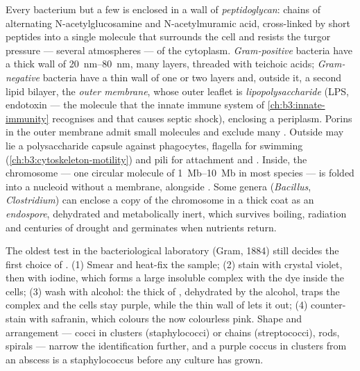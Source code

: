 \begin{definition}\label{def:b3:bacteriology:envelope}
Every bacterium but a few is enclosed in a wall of \emph{peptidoglycan}:
chains of alternating N-acetylglucosamine and N-acetylmuramic acid,
cross-linked by short peptides into a single molecule that surrounds
the cell and resists the turgor pressure --- several atmospheres ---
of the cytoplasm. \emph{Gram-positive} bacteria have a thick wall of
\qtyrange{20}{80}{nm}, many layers, threaded with teichoic acids;
\emph{Gram-negative} bacteria have a thin wall of one or two layers
and, outside it, a second lipid bilayer, the \emph{outer membrane},
whose outer leaflet is \emph{lipopolysaccharide} (LPS, endotoxin ---
the molecule that the innate immune system of
\cref{ch:b3:innate-immunity} recognises and that causes septic shock),
enclosing a periplasm. Porins in the outer membrane admit small
molecules and exclude many . Outside may lie a polysaccharide
capsule against phagocytes, flagella for swimming
(\cref{ch:b3:cytoskeleton-motility}) and pili for attachment and
. Inside, the chromosome --- one circular molecule of
\qtyrange{1}{10}{Mb} in most species --- is folded into a nucleoid
without a membrane, alongside . Some genera (\emph{Bacillus},
\emph{Clostridium}) can enclose a copy of the chromosome in a thick
coat as an \emph{endospore}, dehydrated and metabolically inert, which
survives boiling, radiation and centuries of drought and germinates
when nutrients return.
\end{definition}

\begin{method}\label{met:b3:bacteriology:gram}
The oldest test in the bacteriological laboratory (Gram, 1884) still
decides the first choice of . (1) Smear and heat-fix the
sample; (2) stain with crystal violet, then with iodine, which forms a
large insoluble complex with the dye inside the cells; (3) wash with
alcohol: the thick  of , dehydrated by the
alcohol, traps the complex and the cells stay purple, while the thin
wall of  lets it out; (4) counter-stain with safranin,
which colours the now colourless  pink. Shape and
arrangement --- cocci in clusters (staphylococci) or chains
(streptococci), rods, spirals --- narrow the identification further,
and a purple coccus in clusters from an abscess is a staphylococcus
before any culture has grown.
\end{method}

